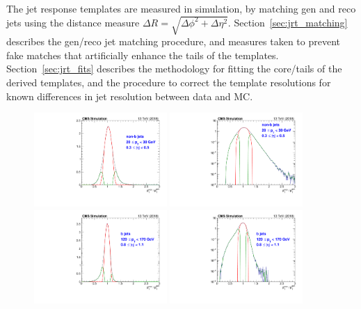 The jet response templates are measured in simulation, by matching gen and reco jets
using the distance measure $\Delta R = \sqrt{\Delta\phi^2+\Delta\eta^2}$.
Section~\ref{sec:jrt_matching} describes the gen/reco jet matching procedure, 
and measures taken to prevent fake matches that artificially enhance the tails of the templates.
Section~\ref{sec:jrt_fits} describes the methodology for fitting the core/tails of the
derived templates, and the procedure to correct the template resolutions for known
differences in jet resolution between data and MC.

\begin{figure}[htbp]
  \begin{center}
    \includegraphics[width=0.45\textwidth]{figs/jetmet/pt01_eta01_nonbjets_lin.pdf}
    \includegraphics[width=0.45\textwidth]{figs/jetmet/pt01_eta01_nonbjets_log.pdf} \\
    \includegraphics[width=0.45\textwidth]{figs/jetmet/pt05_eta03_bjets_lin.pdf}
    \includegraphics[width=0.45\textwidth]{figs/jetmet/pt05_eta03_bjets_log.pdf} \\

\end{center}
\end{figure}
